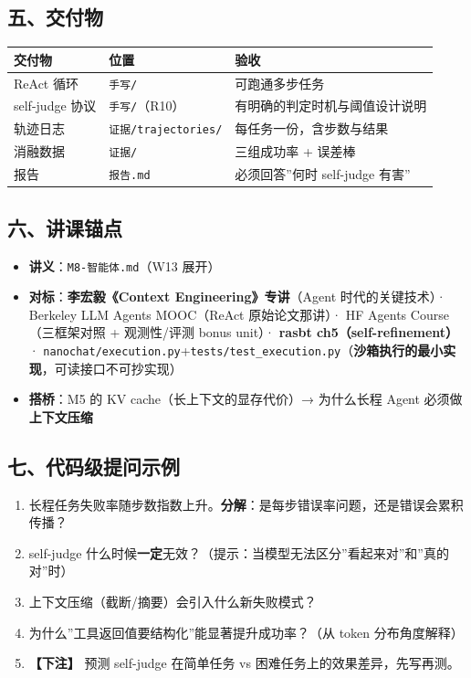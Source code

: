 \documentclass[
  chinese,
  11pt,
]{ctexart}
\newcounter{none} %
\providecommand{\tightlist}{%
  \setlength{\itemsep}{0pt}\setlength{\parskip}{0pt}}
\begin{document}
\subsection{五、交付物}\label{ux4e94ux4ea4ux4ed8ux7269}

{\def\LTcaptype{none} %
\begin{longtable}[]{@{}lll@{}}
\toprule\noalign{}
交付物 & 位置 & 验收 \\
\midrule\noalign{}
\endhead
\bottomrule\noalign{}
\endlastfoot
ReAct 循环 & \texttt{手写/} & 可跑通多步任务 \\
self-judge 协议 & \texttt{手写/}（R10） & 有明确的判定时机与阈值设计说明 \\
轨迹日志 & \texttt{证据/trajectories/} & 每任务一份，含步数与结果 \\
消融数据 & \texttt{证据/} & 三组成功率 + 误差棒 \\
报告 & \texttt{报告.md} & 必须回答''何时 self-judge 有害'' \\
\end{longtable}
}

\subsection{六、讲课锚点}\label{ux516dux8bb2ux8bfeux951aux70b9}

\begin{itemize}
\tightlist
\item
  \textbf{讲义}：\texttt{M8-智能体.md}（W13 展开）
\item
  \textbf{对标}：\textbf{李宏毅《Context Engineering》专讲}（Agent 时代的关键技术）· Berkeley LLM Agents MOOC（ReAct 原始论文那讲）· HF Agents Course（三框架对照 + 观测性/评测 bonus unit）· \textbf{rasbt ch5（self-refinement）} · \texttt{nanochat/execution.py}+\texttt{tests/test\_execution.py}（\textbf{沙箱执行的最小实现}，可读接口不可抄实现）
\item
  \textbf{搭桥}：M5 的 KV cache（长上下文的显存代价）→ 为什么长程 Agent 必须做\textbf{上下文压缩}
\end{itemize}

\subsection{七、代码级提问示例}\label{ux4e03ux4ee3ux7801ux7ea7ux63d0ux95eeux793aux4f8b}

\begin{enumerate}
\def\labelenumi{\arabic{enumi}.}
\tightlist
\item
  长程任务失败率随步数指数上升。\textbf{分解}：是每步错误率问题，还是错误会累积传播？
\item
  self-judge 什么时候\textbf{一定}无效？（提示：当模型无法区分''看起来对''和''真的对''时）
\item
  上下文压缩（截断/摘要）会引入什么新失败模式？
\item
  为什么''工具返回值要结构化''能显著提升成功率？（从 token 分布角度解释）
\item
  \textbf{【下注】} 预测 self-judge 在简单任务 vs 困难任务上的效果差异，先写再测。
\end{enumerate}
\end{document}
